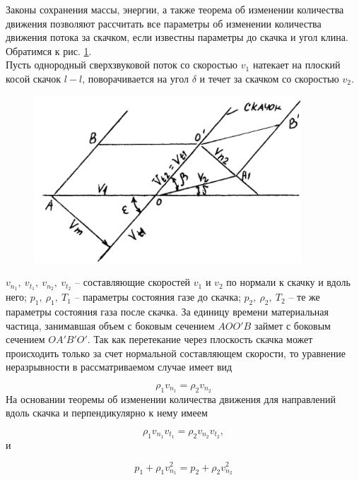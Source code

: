 \documentclass[specialist, subf, href, colorlinks=true, 14pt, final]{disser}
\theoremstyle{definition}
\begin{document}
Законы сохранения массы, энергии, а также теорема об изменении количества движения позволяют рассчитать все параметры об изменении количества движения потока за скачком, если известны параметры до скачка и угол клина. Обратимся к рис. \ref{1-2-2}.\\
\newpage
Пусть однородный сверхзвуковой поток со скоростью $v_1$ натекает на плоский косой скачок $l-l$, поворачивается на угол $\delta$ и течет за скачком со скоростью $v_2$.\\
\begin{figure} 
  \includegraphics[width=100mm]{pics/1-2-2.png}
  \caption{}
  \label{1-2-2}
\end{figure}
$v_{n_1},\ v_{t_1},\ v_{n_2},\ v_{t_2}$ -- составляющие скоростей $v_1$ и $v_2$ по нормали к скачку и вдоль него; $p_{1},\ \rho_{1},\ T_{1}$ -- параметры состояния газе до скачка; $p_{2},\ \rho_{2},\ T_{2}$ -- те же параметры состояния газа после скачка. За единицу времени материальная частица, занимавшая объем с боковым сечением $AOO'B$ займет с боковым сечением $OA'B'O'$. Так как перетекание через плоскость скачка может происходить только за счет нормальной составляющем скорости, то уравнение неразрывности в рассматриваемом случае имеет вид
\addtocounter{equation}{1}
\begin{equation}\label{eq:1211}
  \rho_{1}v_{n_1} = \rho_{2}v_{n_2}
  \tag{11}
\end{equation}
На основании теоремы об изменении количества движения для направлений вдоль скачка и перпендикулярно к нему имеем
\addtocounter{equation}{1}
\begin{equation}\label{eq:1212}
  \rho_{1}v_{n_1}v_{t_1} = \rho_{2}v_{n_2}v_{t_2},
  \tag{12}
\end{equation}
и
\addtocounter{equation}{1}
\begin{equation}\label{eq:1213}
  p_{1} + \rho_{1}v_{n_1}^{2} = p_{2} + \rho_{2}v_{n_2}^{2}
  \tag{13}
\end{equation}
\end{document}
